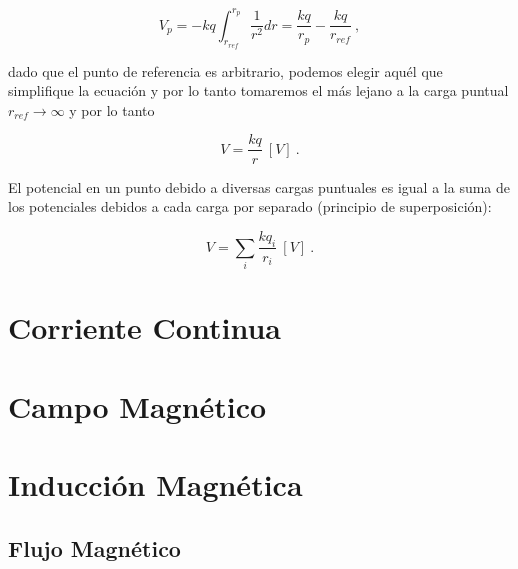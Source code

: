 \documentclass{tufte-handout}
\begin{document}
\begin{equation}
V_p = -kq\int_{r_{ref}}^{r_p}\frac{1}{r^2}dr = \frac{kq}{r_p} - \frac{kq}{r_{ref}}~,
\end{equation}

dado que el punto de referencia es arbitrario, podemos elegir aquél que simplifique la ecuación y por lo tanto tomaremos el más lejano a la carga puntual $r_{ref} \rightarrow \infty$ y por lo tanto

\begin{equation}
V = \frac{kq}{r}~[V]~.
\end{equation}

El potencial en un punto debido a diversas cargas puntuales es igual a la suma de los potenciales debidos a cada carga por separado (principio de superposición):

\begin{equation}
V = \sum_i \frac{kq_i}{r_i}~[V]~.
\end{equation}
\clearpage

\section{Corriente Continua}

\clearpage

\section{Campo Magnético}

\clearpage

\section{Inducción Magnética}

\subsection{Flujo Magnético}
\end{document}
